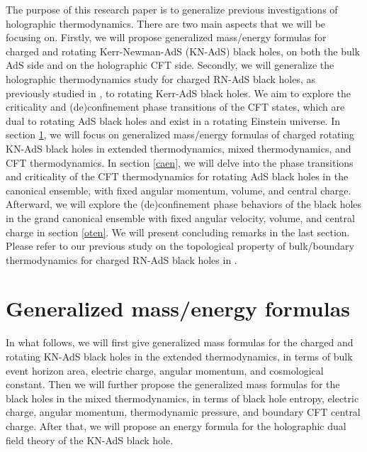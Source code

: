 \documentclass[a4paper,11pt]{article}
\begin{document}
The purpose of this research paper is to generalize previous investigations of holographic thermodynamics. There are two main aspects that we will be focusing on. Firstly, we will propose generalized mass/energy formulas for charged and rotating Kerr-Newman-AdS (KN-AdS) black holes, on both the bulk AdS side and on the holographic CFT side. Secondly, we will generalize the holographic thermodynamics study for charged RN-AdS black holes, as previously studied in \cite{Cong:2021jgb}, to rotating Kerr-AdS black holes. We aim to explore the criticality and (de)confinement phase transitions of the CFT states, which are dual to rotating AdS black holes and exist in a rotating Einstein universe.  In section \ref{mass}, we will focus on generalized mass/energy formulas of charged rotating KN-AdS black holes in extended thermodynamics, mixed thermodynamics, and CFT thermodynamics. In section \ref{caen}, we will delve into the phase transitions and criticality of the CFT thermodynamics for rotating AdS black holes in the canonical ensemble, with fixed angular momentum, volume, and central charge. Afterward, we will explore the (de)confinement phase behaviors of the black holes in the grand canonical ensemble with fixed angular velocity, volume, and central charge in section \ref{oten}.  We will present concluding remarks in the last section. Please refer to our previous study on the topological property of bulk/boundary thermodynamics for charged RN-AdS black holes in \cite{Zhang:2023uay}. 





\section{Generalized mass/energy formulas}\label{mass}
In what follows, we will first give generalized mass formulas for the charged and rotating KN-AdS black holes in the extended thermodynamics, in terms of bulk event horizon area, electric charge, angular momentum, and cosmological constant. Then we will further propose the generalized mass formulas for the black holes in the mixed thermodynamics, in terms of  black hole entropy, electric charge, angular momentum, thermodynamic pressure, and boundary CFT central charge. After that, we will propose an energy formula for the holographic dual field theory of the KN-AdS black hole. 
\end{document}
